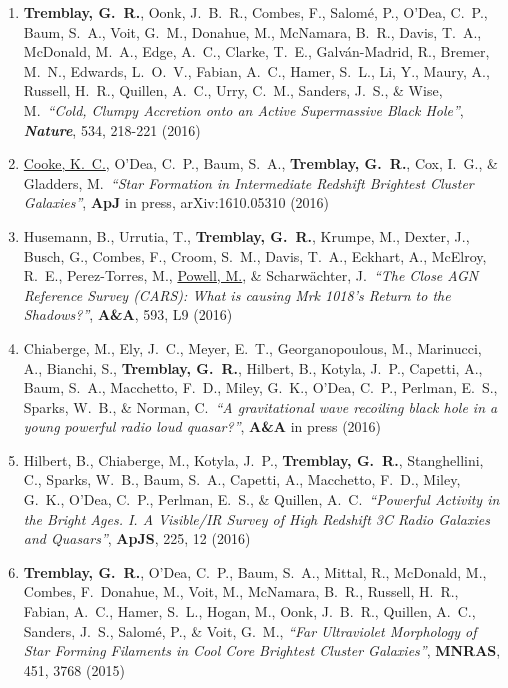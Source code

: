 \documentclass[11pt]{article}
\begin{document}
\begin{enumerate}
\item {\bf Tremblay, G.~R.}, Oonk, J.~B.~R., Combes, F., Salom\'{e}, P., O'Dea, C.~P., Baum, S.~A., Voit, G.~M., Donahue, M., McNamara, B.~R., Davis, T.~A., McDonald, M.~A., Edge, A.~C., Clarke, T.~E., Galv\'{a}n-Madrid, R., Bremer, M.~N., Edwards, L.~O.~V., Fabian, A.~C.,  Hamer, S.~L., Li, Y., Maury, A., Russell, H.~R., Quillen, A.~C., Urry, C.~M., Sanders, J.~S., \& Wise, M.\ {\it ``Cold, Clumpy Accretion onto an Active Supermassive Black Hole''}, \textit{\textbf{Nature}},  534, 218-221 (2016)





\item \uline{Cooke, K.~C.}, O'Dea, C.~P., Baum, S.~A., {\bf Tremblay, G.~R.}, Cox, I.~G., \& Gladders, M.\ {\it ``Star Formation in Intermediate Redshift Brightest Cluster Galaxies''}, \textbf{ApJ} in press, arXiv:1610.05310 (2016)

\item Husemann, B., Urrutia, T., {\bf Tremblay, G.~R.}, Krumpe, M., Dexter, J., Busch, G., Combes, F., Croom, S.~M., Davis, T.~A., Eckhart, A., McElroy, R.~E., Perez-Torres, M., \uline{Powell, M.}, \& Scharw\"{a}chter, J.\ {\it ``The Close AGN Reference Survey (CARS): What is causing Mrk 1018's Return to the Shadows?''}, \textbf{A\&A}, 593, L9 (2016)

\item Chiaberge, M., Ely, J.~C., Meyer, E.~T., 
Georganopoulous, M., Marinucci, A., 
Bianchi, S., {\bf Tremblay, G.~R.}, 
Hilbert, B., Kotyla, J.~P., Capetti, A., 
Baum, S.~A., Macchetto, F.~D., Miley, G.~K., 
O'Dea, C.~P., Perlman, E.~S., Sparks, W.~B., 
\& Norman, C.\ {\it ``A gravitational wave 
recoiling black hole in a young powerful radio loud quasar?''}, {\textbf{A\&A}} in press (2016)

\item Hilbert, B., Chiaberge, M., Kotyla, J.~P., {\bf Tremblay, G.~R.}, Stanghellini, C., Sparks, W.~B., Baum, S.~A., Capetti, A., Macchetto, F.~D., Miley, G.~K., O'Dea, C.~P., Perlman, E.~S., \& Quillen, A.~C.\ {\it ``Powerful Activity in the Bright Ages. I. A Visible/IR Survey of High Redshift 3C Radio Galaxies and Quasars''}, \textbf{ApJS}, 225, 12  (2016)


\item {\bf Tremblay, G.~R.}, O'Dea, C.~P., Baum, S.~A., Mittal, R., McDonald, M., Combes, F.~Donahue, M., Voit, M., McNamara, B.~R., Russell, H.~R., Fabian, A.~C., Hamer, S.~L., Hogan, M., Oonk, J.~B.~R., Quillen, A.~C., Sanders, J.~S., Salom\'{e}, P., \& Voit, G.~M., {\it ``Far Ultraviolet Morphology of Star Forming Filaments in Cool Core Brightest Cluster Galaxies''}, \textbf{MNRAS}, 451, 3768 (2015)


\end{enumerate}
\end{document}
